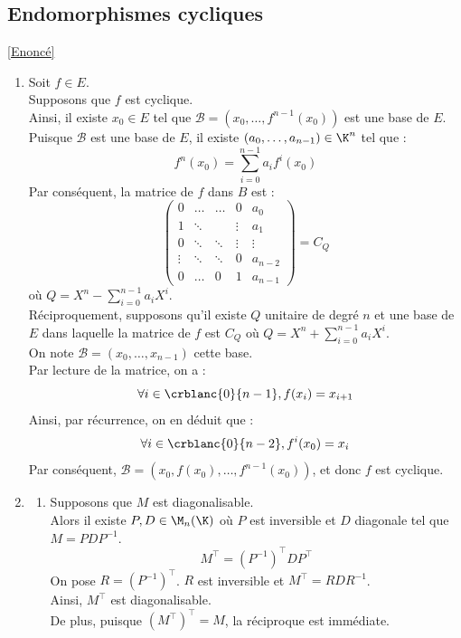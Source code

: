 \documentclass[8pt]{book}
\begin{document}
	\subsection{Endomorphismes cycliques}
	\label{Endomorphismes cycliques corrigé}
	\textcolor{blue}{\hyperref[Endomorphismes cycliques]{[Enoncé]}}\\
	\begin{enumerate}
		\item Soit $f\in E$.\\
		Supposons que $f$ est cyclique.\\
		Ainsi, il existe $x_0\in E$ tel que $\mathcal{B}=(x_0,\dots,f^{n-1}(x_0))$ est une base de $E$.\\
		Puisque $\mathcal{B}$ est une base de $E$, il existe $(a_0,\dots,a_{n-1})\in\K^n$ tel que :
		\[f^n(x_0)=\sum_{i=0}^{n-1}a_if^i(x_0)\]
		Par conséquent, la matrice de $f$ dans $B$ est :
		\[\begin{pmatrix}
			0&\dots&\dots&0&a_0\\
			1&\ddots&\ &\vdots&a_1\\
			0&\ddots&\ddots&\vdots&\vdots\\
			\vdots&\ddots&\ddots&0&a_{n-2}\\
			0&\dots&0&1&a_{n-1}
		\end{pmatrix}=C_Q\]
		où $Q=X^n-\sum_{i=0}^{n-1}a_iX^i$.\\
		Réciproquement, supposons qu'il existe $Q$ unitaire de degré $n$ et une base de $E$ dans laquelle la matrice de $f$ est $C_Q$ où $Q=X^n+\sum_{i=0}^{n-1}a_iX^i$.\\
		On note $\mathcal{B}=(x_0,\dots,x_{n-1})$ cette base.\\
		Par lecture de la matrice, on a :
		\[\forall i\in\crblanc{0}{n-1}, f(x_i)=x_{i+1}\]
		Ainsi, par récurrence, on en déduit que :
		\[\forall i\in\crblanc{0}{n-2}, f^i(x_0)=x_i\]
		Par conséquent, $\mathcal{B}=(x_0,f(x_0),\dots,f^{n-1}(x_0))$, et donc $f$ est cyclique.
		\item \begin{enumerate}[label=\alph*.]
			\item Supposons que $M$ est diagonalisable.\\
			Alors il existe $P,D\in\M_{n}(\K)$ où $P$ est inversible et $D$ diagonale tel que $M=PDP^{-1}$.
			\[M^\top=(P^{-1})^\top DP^\top\]
			On pose $R=(P^{-1})^\top$. $R$ est inversible et $M^\top=RDR^{-1}$.\\
			Ainsi, $M^\top$ est diagonalisable.\\
			De plus, puisque $(M^\top)^\top=M$, la réciproque est immédiate.

\end{enumerate}
\end{enumerate}
\end{document}
